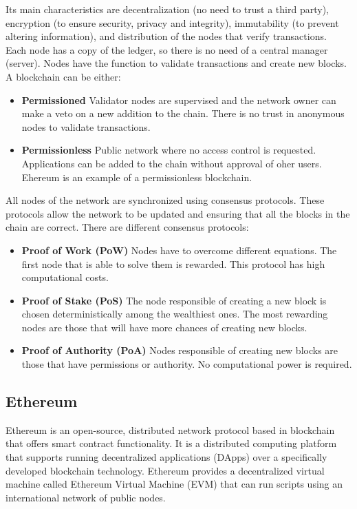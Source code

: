 \documentclass[10pt]{article}
\begin{document}
\begin{multicols}{2}
Its main characteristics are decentralization (no need to trust a third party), encryption (to ensure security, privacy and integrity), immutability (to prevent altering information), and distribution of the nodes that verify transactions.\\

Each node has a copy of the ledger, so there is no need of a central manager (server). Nodes have the function to validate transactions and create new blocks.\\

A blockchain can be either:

\begin{itemize}
	\item \textbf{Permissioned} Validator nodes are supervised and the network owner can make a veto on a new addition to the chain. There is no trust in anonymous nodes to validate transactions.
	\item \textbf{Permissionless} Public network where no access control is requested. Applications can be added to the chain without approval of oher users. Ehereum is an example of a permissionless blockchain.
\end{itemize}

All nodes of the network are synchronized using consensus protocols. These protocols allow the network to be updated and ensuring that all the blocks in the chain are correct. There are different consensus protocols:

\begin{itemize}
	\item \textbf{Proof of Work (PoW)} Nodes have to overcome different equations. The first node that is able to solve them is rewarded. This protocol has high computational costs.
	\item \textbf{Proof of Stake (PoS)} The node responsible of creating a new block is chosen deterministically among the wealthiest ones. The most rewarding nodes are those that will have more chances of creating new blocks.
	\item \textbf{Proof of Authority (PoA)} Nodes responsible of creating new blocks are those that have permissions or authority. No computational power is required.
\end{itemize}

\subsection{Ethereum}

Ethereum is an open-source, distributed network protocol based in blockchain that offers smart contract functionality. It is a distributed computing platform that supports running decentralized applications (DApps) over a specifically developed blockchain technology. Ethereum provides a decentralized virtual machine called Ethereum Virtual Machine (EVM) that can run scripts using an international network of public nodes.\\


\end{multicols}
\end{document}

